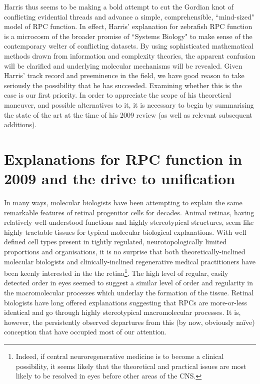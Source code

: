 Harris thus seems to be making a bold attempt to cut the Gordian knot of conflicting evidential threads and advance a simple, comprehensible, ``mind-sized" model of RPC function. In effect, Harris' explanation for zebrafish RPC function is a microcosm of the broader promise of ``Systems Biology" to make sense of the contemporary welter of conflicting datasets. By using sophisticated mathematical methods drawn from information and complexity theories, the apparent confusion will be clarified and underlying molecular mechanisms will be revealed. Given Harris' track record and preeminence in the field, we have good reason to take seriously the possibility that he has succeeded. Examining whether this is the case is our first priority. In order to appreciate the scope of his theoretical maneuver, and possible alternatives to it, it is necessary to begin by summarising the state of the art at the time of his 2009 review (as well as relevant subsequent additions).

\section{Explanations for RPC function in 2009 and the drive to unification}
\label{sec:TheoryOptions}
In many ways, molecular biologists have been attempting to explain the same remarkable features of retinal progenitor cells for decades. Animal retinas, having relatively well-understood functions and highly stereotypical structures, seem like highly tractable tissues for typical molecular biological explanations. With well defined cell types present in tightly regulated, neurotopologically limited proportions and organisations, it is no surprise that both theoretically-inclined molecular biologists and clinically-inclined regenerative medical practitioners have been keenly interested in the the retina\footnote{Indeed, if central neuroregenerative medicine is to become a clinical possibility, it seems likely that the theoretical and practical issues are most likely to be resolved in eyes before other areas of the CNS.}. The high level of regular, easily detected order in eyes seemed to suggest a similar level of order and regularity in the macromolecular processes which underlay the formation of the tissue. Retinal biologists have long offered explanations suggesting that RPCs are more-or-less identical and go through highly stereotypical macromolecular processes. It is, however, the persistently observed departures from this (by now, obviously na{\"i}ve) conception that have occupied most of our attention.

